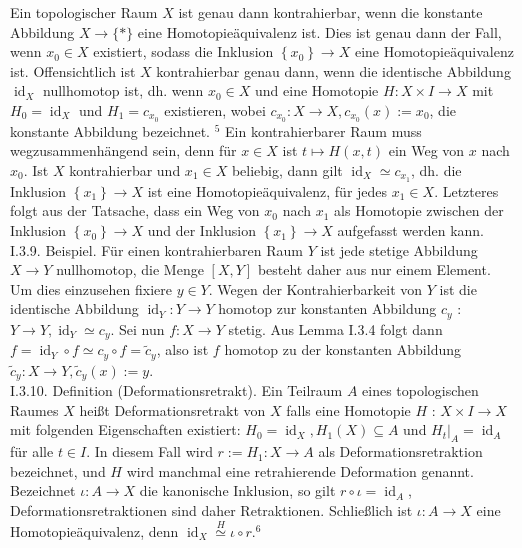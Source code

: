 \documentclass[10pt]{article}
\begin{document}
Ein topologischer Raum $X$ ist genau dann kontrahierbar, wenn die konstante Abbildung $X \rightarrow\{*\}$ eine Homotopieäquivalenz ist. Dies ist genau dann der Fall,\\
wenn $x_{0} \in X$ existiert, sodass die Inklusion $\left\{x_{0}\right\} \rightarrow X$ eine Homotopieäquivalenz ist. Offensichtlich ist $X$ kontrahierbar genau dann, wenn die identische Abbildung $\operatorname{id}_{X}$ nullhomotop ist, dh. wenn $x_{0} \in X$ und eine Homotopie $H: X \times I \rightarrow X$ mit $H_{0}=\operatorname{id}_{X}$ und $H_{1}=c_{x_{0}}$ existieren, wobei $c_{x_{0}}: X \rightarrow X, c_{x_{0}}(x):=x_{0}$, die konstante Abbildung bezeichnet. ${ }^{5}$ Ein kontrahierbarer Raum muss wegzusammenhängend sein, denn für $x \in X$ ist $t \mapsto H(x, t)$ ein Weg von $x$ nach $x_{0}$. Ist $X$ kontrahierbar und $x_{1} \in X$ beliebig, dann gilt $\operatorname{id}_{X} \simeq c_{x_{1}}$, dh. die Inklusion $\left\{x_{1}\right\} \rightarrow X$ ist eine Homotopieäquivalenz, für jedes $x_{1} \in X$. Letzteres folgt aus der Tatsache, dass ein Weg von $x_{0}$ nach $x_{1}$ als Homotopie zwischen der Inklusion $\left\{x_{0}\right\} \rightarrow X$ und der Inklusion $\left\{x_{1}\right\} \rightarrow X$ aufgefasst werden kann.\\
I.3.9. Beispiel. Für einen kontrahierbaren Raum $Y$ ist jede stetige Abbildung $X \rightarrow Y$ nullhomotop, die Menge $[X, Y]$ besteht daher aus nur einem Element. Um dies einzusehen fixiere $y \in Y$. Wegen der Kontrahierbarkeit von $Y$ ist die identische Abbildung $\operatorname{id}_{Y}: Y \rightarrow Y$ homotop zur konstanten Abbildung $c_{y}$ : $Y \rightarrow Y, \operatorname{id}_{Y} \simeq c_{y}$. Sei nun $f: X \rightarrow Y$ stetig. Aus Lemma I.3.4 folgt dann $f=\operatorname{id}_{Y} \circ f \simeq c_{y} \circ f=\tilde{c}_{y}$, also ist $f$ homotop zu der konstanten Abbildung $\tilde{c}_{y}: X \rightarrow Y, \tilde{c}_{y}(x):=y$.\\
I.3.10. Definition (Deformationsretrakt). Ein Teilraum $A$ eines topologischen Raumes $X$ heißt Deformationsretrakt von $X$ falls eine Homotopie $H$ : $X \times I \rightarrow X$ mit folgenden Eigenschaften existiert: $H_{0}=\operatorname{id}_{X}, H_{1}(X) \subseteq A$ und $\left.H_{t}\right|_{A}=\operatorname{id}_{A}$ für alle $t \in I$. In diesem Fall wird $r:=H_{1}: X \rightarrow A$ als Deformationsretraktion bezeichnet, und $H$ wird manchmal eine retrahierende Deformation genannt. Bezeichnet $\iota: A \rightarrow X$ die kanonische Inklusion, so gilt $r \circ \iota=\operatorname{id}_{A}$, Deformationsretraktionen sind daher Retraktionen. Schließlich ist $\iota: A \rightarrow X$ eine Homotopieäquivalenz, denn $\operatorname{id}_{X} \stackrel{H}{\simeq} \iota \circ r .{ }^{6}$\\
\end{document}
